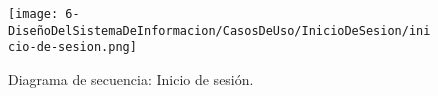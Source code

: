 \begin{figure}[H]
	\centering
	\texttt{[image: 6-DiseñoDelSistemaDeInformacion/CasosDeUso/InicioDeSesion/inicio-de-sesion.png]}
	\caption{Diagrama de secuencia: Inicio de sesión.}
\end{figure}